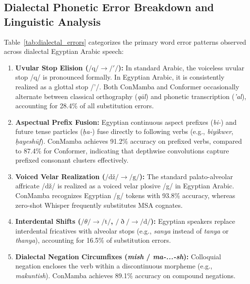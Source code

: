 \documentclass[journal]{IEEEtran}
\begin{document}
\subsection{Dialectal Phonetic Error Breakdown and Linguistic Analysis}
\label{sec:linguistic_analysis}
Table~\ref{tab:dialectal_errors} categorizes the primary word error patterns observed across dialectal Egyptian Arabic speech:
\begin{enumerate}
    \item \textbf{Uvular Stop Elision ($/\text{q}/ \to /'/ $):} In standard Arabic, the voiceless uvular stop /q/ is pronounced formally. In Egyptian Arabic, it is consistently realized as a glottal stop /'/. Both ConMamba and Conformer occasionally alternate between classical orthography (\textit{q\=al}) and phonetic transcription (\textit{'al}), accounting for 28.4\% of all substitution errors.
    \item \textbf{Aspectual Prefix Fusion:} Egyptian continuous aspect prefixes (\textit{bi-}) and future tense particles (\textit{\d{h}a-}) fuse directly to following verbs (e.g., \textit{biyikwer}, \textit{\d{h}ayesh\=uf}). ConMamba achieves 91.2\% accuracy on prefixed verbs, compared to 87.4\% for Conformer, indicating that depthwise convolutions capture prefixed consonant clusters effectively.
    \item \textbf{Voiced Velar Realization ($/\text{d\v{z}}/ \to /\text{g}/$):} The standard palato-alveolar affricate /d\v{z}/ is realized as a voiced velar plosive /g/ in Egyptian Arabic. ConMamba recognizes Egyptian /g/ tokens with 93.8\% accuracy, whereas zero-shot Whisper frequently substitutes MSA cognates.
    \item \textbf{Interdental Shifts ($/\theta/ \to /\text{t}/$, $/\eth/ \to /\text{d}/$):} Egyptian speakers replace interdental fricatives with alveolar stops (e.g., \textit{sanya} instead of \textit{tanya} or \textit{thanya}), accounting for 16.5\% of substitution errors.
    \item \textbf{Dialectal Negation Circumfixes (\textit{mish} / \textit{ma-...-sh}):} Colloquial negation encloses the verb within a discontinuous morpheme (e.g., \textit{makuntish}). ConMamba achieves 89.1\% accuracy on compound negations.
\end{enumerate}
\end{document}
